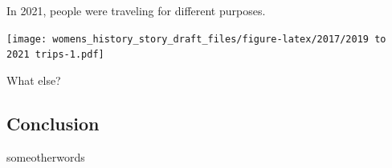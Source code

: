\documentclass[
  12pt,
]{article}
\begin{document}
\begin{flushleft}
In 2021, people were traveling for different purposes.
\end{flushleft}

\texttt{[image: womens\_history\_story\_draft\_files/figure-latex/2017/2019 to 2021 trips-1.pdf]}

\begin{flushleft}
What else?
\end{flushleft}

\newpage
\setlength{\headheight}{10pt}
\setlength{\textheight}{665pt}
\fancyhead[L]{}

\subsection{Conclusion}
\begin{flushleft}

someotherwords
\end{flushleft}
\end{document}
